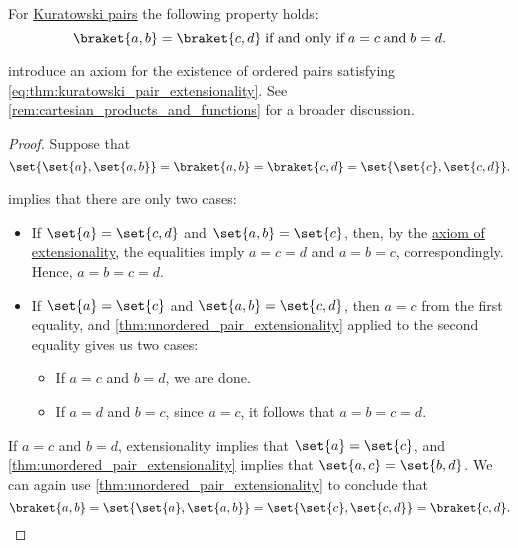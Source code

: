 \begin{proposition}\label{thm:kuratowski_pair_extensionality}
  For \hyperref[def:kuratowski_pair]{Kuratowski pairs} the following property holds:
  \begin{equation}\label{eq:thm:kuratowski_pair_extensionality}
    \braket{ a, b } = \braket{ c, d } \T{if and only if} a = c \T{and} b = d.
  \end{equation}
\end{proposition}
\begin{comments}
  \item {} introduce an axiom for the existence of ordered pairs satisfying \eqref{eq:thm:kuratowski_pair_extensionality}. See \cref{rem:cartesian_products_and_functions} for a broader discussion.
\end{comments}
\begin{proof}
  \SufficiencySubProof Suppose that
  \begin{equation*}
    \set{ \set{ a }, \set{ a, b } }
    =
    \braket{ a, b }
    =
    \braket{ c, d }
    =
    \set{ \set{ c }, \set{ c, d } }.
  \end{equation*}

   implies that there are only two cases:
  \begin{itemize}
    \item If \( \set{ a } = \set{ c, d } \) and \( \set{ a, b } = \set{ c } \), then, by the \hyperref[def:naive_set_theory/extensionality]{axiom of extensionality}, the equalities imply \( a = c = d \) and \( a = b = c \), correspondingly. Hence, \( a = b = c = d \).

    \item If \( \set{ a } = \set{ c } \) and \( \set{ a, b } = \set{ c, d } \), then \( a = c \) from the first equality, and \cref{thm:unordered_pair_extensionality} applied to the second equality gives us two cases:
    \begin{itemize}
      \item If \( a = c \) and \( b = d \), we are done.
      \item If \( a = d \) and \( b = c \), since \( a = c \), it follows that \( a = b = c = d \).
    \end{itemize}
  \end{itemize}

  \NecessitySubProof If \( a = c \) and \( b = d \), extensionality implies that \( \set{ a } = \set{ c } \), and \cref{thm:unordered_pair_extensionality} implies that \( \set{ a, c } = \set{ b, d } \). We can again use \cref{thm:unordered_pair_extensionality} to conclude that
  \begin{equation*}
    \braket{ a, b }
    =
    \set{ \set{ a }, \set{ a, b } }
    =
    \set{ \set{ c }, \set{ c, d } }
    =
    \braket{ c, d }.
  \end{equation*}
\end{proof}

